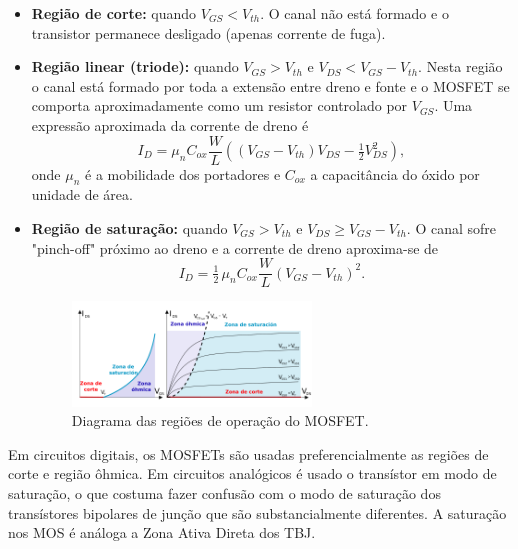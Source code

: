 \documentclass[12pt]{article}
\begin{document}
                \begin{itemize}

                    \item \textbf{Região de corte:} quando $V_{GS}<V_{th}$. O canal não está formado e o transistor permanece desligado (apenas corrente de fuga).

                    \item \textbf{Região linear (triode):} quando $V_{GS}>V_{th}$ e $V_{DS}<V_{GS}-V_{th}$. Nesta região o canal está formado por toda a extensão entre dreno e fonte e o MOSFET se comporta aproximadamente como um resistor controlado por $V_{GS}$. Uma expressão aproximada da corrente de dreno é
                    \[
                    I_D = \mu_n C_{ox} \frac{W}{L}\left((V_{GS}-V_{th})V_{DS}-\tfrac{1}{2}V_{DS}^2\right),
                    \]
                    onde $\mu_n$ é a mobilidade dos portadores e $C_{ox}$ a capacitância do óxido por unidade de área.

                    \item \textbf{Região de saturação:} quando $V_{GS}>V_{th}$ e $V_{DS}\ge V_{GS}-V_{th}$. O canal sofre "pinch-off" próximo ao dreno e a corrente de dreno aproxima-se de
                    \[
                    I_D = \tfrac{1}{2}\,\mu_n C_{ox} \frac{W}{L}(V_{GS}-V_{th})^2.
                    \]

                        \begin{figure}[htpb!]

                            \centering
                            \includegraphics[width=0.6\textwidth]{./images/MOSFET_enhancement-mode_n-channel.svg.png}
                            \caption{Diagrama das regiões de operação do MOSFET.}

                        \end{figure}

                \end{itemize}

            Em circuitos digitais, os MOSFETs são usadas preferencialmente as regiões de corte e região ôhmica. Em circuitos analógicos é usado o transístor em modo de saturação, o que costuma fazer confusão com o modo de saturação dos transístores bipolares de junção que são substancialmente diferentes. A saturação nos MOS é análoga a Zona Ativa Direta dos TBJ.
\end{document}

